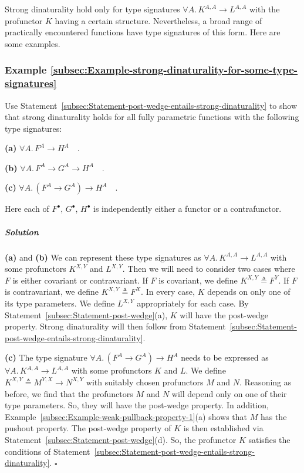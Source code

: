 Strong dinaturality hold only for type signatures $\forall A.\,K^{A,A}\rightarrow L^{A,A}$
with the profunctor $K$ having a certain structure. Nevertheless,
a broad range of practically encountered functions have type signatures
of this form. Here are some examples.

\subsubsection{Example \label{subsec:Example-strong-dinaturality-for-some-type-signatures}\ref{subsec:Example-strong-dinaturality-for-some-type-signatures}}

Use Statement~\ref{subsec:Statement-post-wedge-entails-strong-dinaturality}
to show that strong dinaturality holds for all fully parametric functions
with the following type signatures:

\textbf{(a)} $\forall A.\,F^{A}\rightarrow H^{A}\quad.$

\textbf{(b)} $\forall A.\,F^{A}\rightarrow G^{A}\rightarrow H^{A}\quad.$

\textbf{(c)} $\forall A.\,(F^{A}\rightarrow G^{A})\rightarrow H^{A}\quad.$

Here each of $F^{\bullet}$, $G^{\bullet}$, $H^{\bullet}$ is independently
either a functor or a contrafunctor. 

\subparagraph{Solution}

\textbf{(a)} and \textbf{(b)} We can represent these type signatures
as $\forall A.\,K^{A,A}\rightarrow L^{A,A}$ with some profunctors
$K^{X,Y}$ and $L^{X,Y}$. Then we will need to consider two cases
where $F$ is either covariant or contravariant. If $F$ is covariant,
we define $K^{X,Y}\triangleq F^{Y}$. If $F$ is contravariant, we
define $K^{X,Y}\triangleq F^{X}$. In every case, $K$ depends on
only one of its type parameters. We define $L^{X,Y}$ appropriately
for each case. By Statement~\ref{subsec:Statement-post-wedge}(a),
$K$ will have the post-wedge property. Strong dinaturality will then
follow from Statement~\ref{subsec:Statement-post-wedge-entails-strong-dinaturality}.

\textbf{(c)} The type signature $\forall A.\,(F^{A}\rightarrow G^{A})\rightarrow H^{A}$
needs to be expressed as $\forall A.\,K^{A,A}\rightarrow L^{A,A}$
with some profunctors $K$ and $L$. We define $K^{X,Y}\triangleq M^{Y,X}\rightarrow N^{X,Y}$
with suitably chosen profunctors $M$ and $N$. Reasoning as before,
we find that the profunctors $M$ and $N$ will depend only on one
of their type parameters. So, they will have the post-wedge property.
In addition, Example~\ref{subsec:Example-weak-pullback-property-1}(a)
shows that $M$ has the pushout property. The post-wedge property
of $K$ is then established via Statement~\ref{subsec:Statement-post-wedge}(d).
So, the profunctor $K$ satisfies the conditions of Statement~\ref{subsec:Statement-post-wedge-entails-strong-dinaturality}.
$\square$

